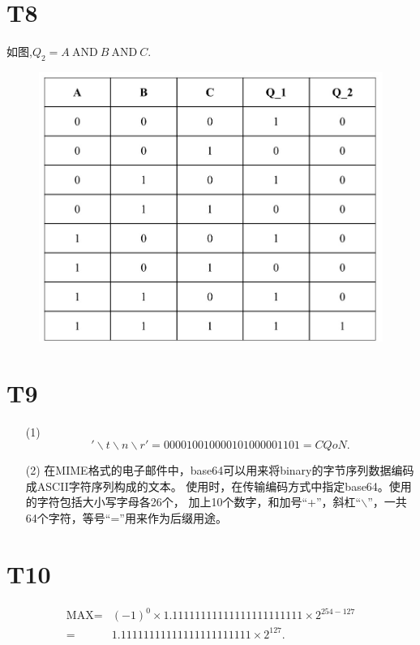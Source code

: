\documentclass{article}
\begin{document}
\section*{T8}如图,$Q_2=A\ \mbox{AND}\ B\ \mbox{AND}\ C.$
\begin{figure}[h]
    \centering
    \includegraphics[scale=0.5]{04.jpg}
\end{figure}
\section*{T9}
\begin{enumerate}
    \item [(1)]
    \[
        '\backslash t \backslash n \backslash r'=00001001 00001010 00001101=CQoN.
    \]
    \item [(2)]
    在MIME格式的电子邮件中，base64可以用来将binary的字节序列数据编码成ASCII字符序列构成的文本。
    使用时，在传输编码方式中指定base64。使用的字符包括大小写字母各26个，
    加上10个数字，和加号“+”，斜杠“$\backslash$”，一共64个字符，等号“=”用来作为后缀用途。
\end{enumerate}
\section*{T10}
    \begin{align*}
        \mbox{MAX}
        =&{(-1)}^0\times 1.1111 1111 1111 1111 1111 111\times 2^{254-127}\\
        =&1.1111 1111 1111 1111 1111 111\times 2^{127}.
    \end{align*}
\clearpage
\end{document}
